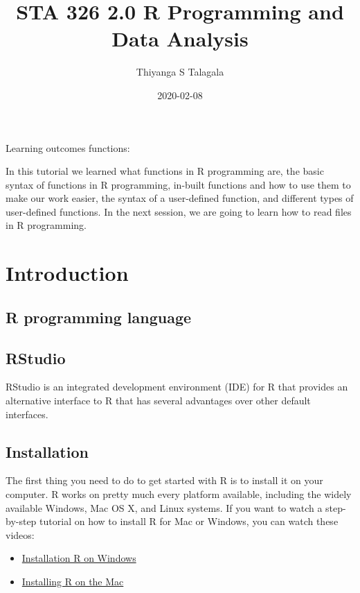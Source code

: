 \documentclass[]{book}
\title{STA 326 2.0 R Programming and Data Analysis}
\author{Thiyanga S Talagala}
\date{2020-02-08}
\begin{document}
\maketitle

{
\setcounter{tocdepth}{1}
\tableofcontents
}
Learning outcomes functions:

In this tutorial we learned what functions in R programming are, the basic syntax of functions in R programming, in-built functions and how to use them to make our work easier, the syntax of a user-defined function, and different types of user-defined functions. In the next session, we are going to learn how to read files in R programming.

\hypertarget{elements}{%
\chapter{Introduction}\label{elements}}

\hypertarget{r-programming-language}{%
\section{R programming language}\label{r-programming-language}}

\hypertarget{rstudio}{%
\section{RStudio}\label{rstudio}}

RStudio is an integrated development environment (IDE) for R that provides an alternative interface to R that has several advantages over other default interfaces.

\hypertarget{installation}{%
\section{Installation}\label{installation}}

The first thing you need to do to get started with R is to install it on your computer. R works on pretty much every platform available, including the widely available Windows, Mac OS X, and Linux systems. If you want to watch a step-by-step tutorial on how to install R for Mac or Windows, you can watch these videos:

\begin{itemize}
\item
  \href{https://www.youtube.com/watch?v=Ohnk9hcxf9M\&feature=youtu.be}{Installation R on Windows}
\item
  \href{https://www.youtube.com/watch?v=uxuuWXU-7UQ\&feature=youtu.be}{Installing R on the Mac}
\end{itemize}
\end{document}
